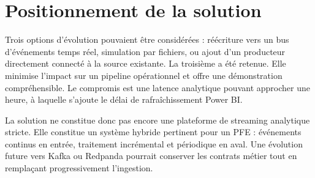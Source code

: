 \section{Positionnement de la solution}
Trois options d'évolution pouvaient être considérées : réécriture vers un bus d'événements temps réel, simulation par fichiers, ou ajout d'un producteur directement connecté à la source existante. La troisième a été retenue. Elle minimise l'impact sur un pipeline opérationnel et offre une démonstration compréhensible. Le compromis est une latence analytique pouvant approcher une heure, à laquelle s'ajoute le délai de rafraîchissement Power BI.

La solution ne constitue donc pas encore une plateforme de streaming analytique stricte. Elle constitue un système hybride pertinent pour un PFE : événements continus en entrée, traitement incrémental et périodique en aval. Une évolution future vers Kafka ou Redpanda pourrait conserver les contrats métier tout en remplaçant progressivement l'ingestion.

